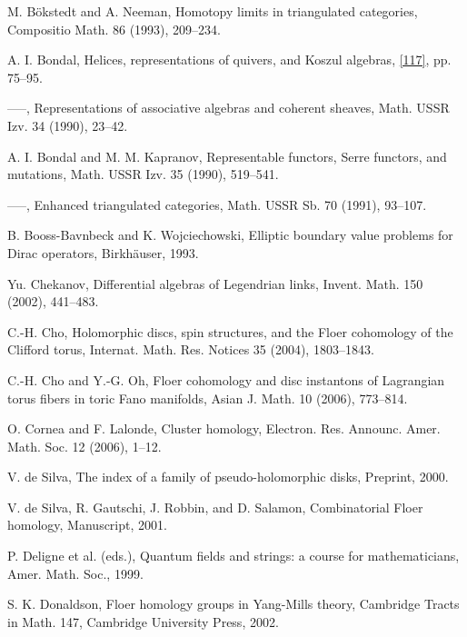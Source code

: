 \begin{list}{}{\setlength{\leftmargin}{3em}\setlength{\labelwidth}{2.5em}\setlength{\itemsep}{.5em}\small}
\item[\hypertarget{bib:24}{[24]}] M. Bökstedt and A. Neeman, Homotopy limits in triangulated categories, Compositio Math. 86 (1993), 209–234. 
\item[\hypertarget{bib:25}{[25]}] A. I. Bondal, Helices, representations of quivers, and Koszul algebras, \hyperlink{bib:117}{[117]}, pp. 75–95. 
\item[\hypertarget{bib:26}{[26]}] —–, Representations of associative algebras and coherent sheaves, Math. USSR Izv. 34 (1990), 23–42. 
\item[\hypertarget{bib:27}{[27]}] A. I. Bondal and M. M. Kapranov, Representable functors, Serre functors, and mutations, Math. USSR Izv. 35 (1990), 519–541. 
\item[\hypertarget{bib:28}{[28]}] —–, Enhanced triangulated categories, Math. USSR Sb. 70 (1991), 93–107. 
\item[\hypertarget{bib:29}{[29]}] B. Booss-Bavnbeck and K. Wojciechowski, Elliptic boundary value problems for Dirac operators, Birkhäuser, 1993. 
\item[\hypertarget{bib:30}{[30]}] Yu. Chekanov, Differential algebras of Legendrian links, Invent. Math. 150 (2002), 441–483. 
\item[\hypertarget{bib:31}{[31]}] C.-H. Cho, Holomorphic discs, spin structures, and the Floer cohomology of the Clifford torus, Internat. Math. Res. Notices 35 (2004), 1803–1843. 
\item[\hypertarget{bib:32}{[32]}] C.-H. Cho and Y.-G. Oh, Floer cohomology and disc instantons of Lagrangian torus fibers in toric Fano manifolds, Asian J. Math. 10 (2006), 773–814. 
\item[\hypertarget{bib:33}{[33]}] O. Cornea and F. Lalonde, Cluster homology, Electron. Res. Announc. Amer. Math. Soc. 12 (2006), 1–12. 
\item[\hypertarget{bib:34}{[34]}] V. de Silva, The index of a family of pseudo-holomorphic disks, Preprint, 2000. 
\item[\hypertarget{bib:35}{[35]}] V. de Silva, R. Gautschi, J. Robbin, and D. Salamon, Combinatorial Floer homology, Manuscript, 2001. 
\item[\hypertarget{bib:36}{[36]}] P. Deligne et al. (eds.), Quantum fields and strings: a course for mathematicians, Amer. Math. Soc., 1999. 
\item[\hypertarget{bib:37}{[37]}] S. K. Donaldson, Floer homology groups in Yang-Mills theory, Cambridge Tracts in Math. 147, Cambridge University Press, 2002. 

\end{list}
